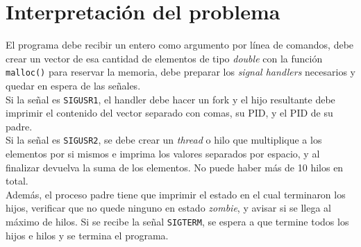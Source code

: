 \section{Interpretación del problema}
El programa debe recibir un entero como argumento por línea de comandos, debe crear un vector de esa cantidad de elementos de tipo \textit{double} con la función \texttt{malloc()} para reservar la memoria, debe preparar los \textit{signal handlers} necesarios y quedar en espera de las señales.\\

Si la señal es \texttt{SIGUSR1}, el handler debe hacer un fork y el hijo resultante debe imprimir el contenido del vector separado con comas, su PID, y el PID de su padre.\\

Si la señal es \texttt{SIGUSR2}, se debe crear un \textit{thread} o hilo que multiplique a los elementos por si mismos e imprima los valores separados por espacio, y al finalizar devuelva la suma de los elementos. No puede haber más de 10 hilos en total.\\

Además, el proceso padre tiene que imprimir el estado en el cual terminaron los hijos, verificar que no quede ninguno en estado \textit{zombie}, y avisar si se llega al máximo de hilos. Si se recibe la señal \texttt{SIGTERM}, se espera a que termine todos los hijos e hilos y se termina el programa.
